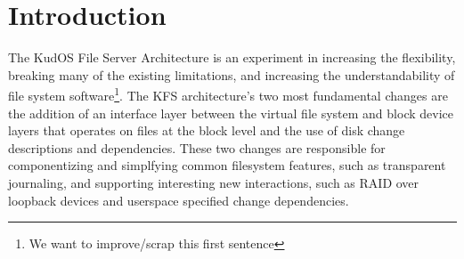 \section{Introduction}
\label{sec:intro}

The KudOS File Server Architecture is an experiment in increasing the
flexibility, breaking many of the existing limitations, and increasing
the understandability of file system software\footnote{We want to
  improve/scrap this first sentence}.  The KFS architecture's two most
fundamental changes are the addition of an interface layer between the
virtual file system and block device layers that operates on files at
the block level and the use of disk change descriptions and
dependencies. These two changes are responsible for componentizing and
simplfying common filesystem features, such as transparent journaling,
and supporting interesting new interactions, such as RAID over
loopback devices and userspace specified change dependencies.
